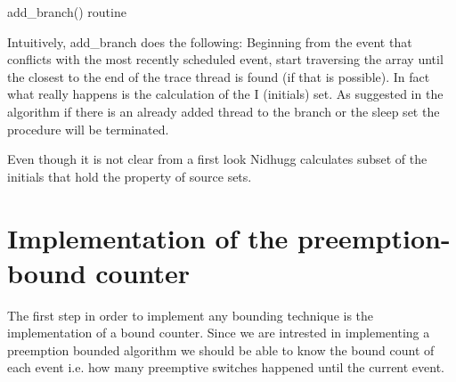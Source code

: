 \begin{algorithm}
    \caption{add\_branch() routine}
\end{algorithm}

Intuitively, add\_branch does the following: Beginning from the event that conflicts with the most recently scheduled event, start traversing
the array until the closest to the end of the trace thread is found (if that is possible). In fact what really happens is the calculation of the
I (initials) set. As suggested in the algorithm if there is an already added thread to the branch or the sleep set the procedure will be terminated.

Even though it is not clear from a first look Nidhugg calculates subset of the initials that hold the property of source sets.

\section{Implementation of the preemption-bound counter}

The first step in order to implement any bounding technique is the implementation of a bound counter. Since we are intrested in implementing
a preemption bounded algorithm we should be able to know the bound count of each event i.e. how many preemptive switches happened until the current 
event. 

